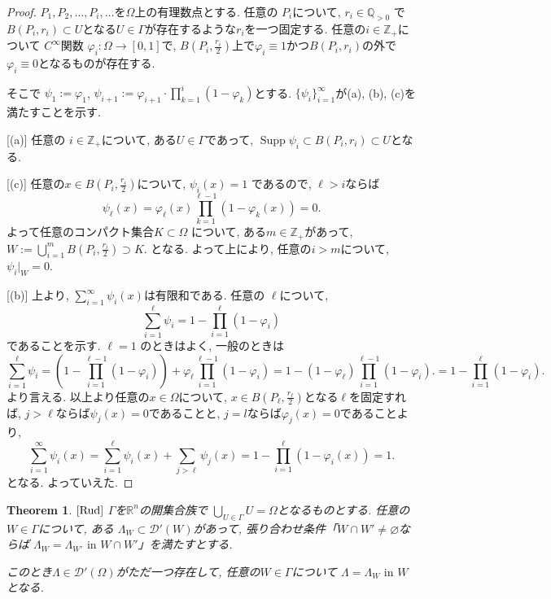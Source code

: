 \documentclass[dvipdfmx,a4paper,11pt]{article} %
\newtheorem{thm}{Theorem}[section]
\theoremstyle{definition}
\theoremstyle{remark}
\numberwithin{equation}{section}
\newcommand{\N}{\mathbb{Z}_+}
\begin{document}
\begin{proof}
\(P_1, P_2, \dots, P_i, \dots\)を\(\Omega\)上の有理数点とする. 
任意の \(P_i\)について,  \(r_i \in \mathbb{Q}_{>0}\) で\(B(P_i, r_i) \subset U\)となる$U \in \Gamma$が存在するような$r_i$を一つ固定する. 
任意の\(i \in \N\)について
\(C^\infty\)関数 \(\varphi_i: \Omega \to [0,1]\)で, 
$B(P_i, \tfrac{r_i}{2})$上で\(\varphi_i \equiv 1\)かつ\(B(P_i, r_i)\)の外で\(\varphi_i \equiv 0\)となるものが存在する.

そこで \(\psi_1 := \varphi_1\), \(\psi_{i+1} := \varphi_{i+1} \cdot \prod_{k=1}^i (1-\varphi_k)\)とする.
 \(\{\psi_i\}_{i=1}^\infty\)が(a), (b), (c)を満たすことを示す.

[(a)]
任意の \(i \in \N\)について, ある$U \in \Gamma$であって, 
 \(\operatorname{Supp}\psi_i \subset B(P_i, r_i) \subset U\)となる.
 
 [(c)]
任意の\(x \in B(P_i, \tfrac{r_i}{2})\)について, $\psi_i (x)=1$
であるので, $\ell>i$ならば 
\[
\psi_\ell(x) = \varphi_\ell(x) \prod_{k=1}^{\ell -1} (1-\varphi_k(x)) = 0.
\]
よって任意のコンパクト集合\( K \subset \Omega\) について, ある\( m \in \N\)があって,   
\(W := \bigcup_{i=1}^m B(P_i, \tfrac{r_i}{2}) \supset K\). 
となる. よって上により,  任意の$ i > m$について, \(\psi_i|_W = 0\). 

[(b)]
上より, \(\sum_{i=1}^\infty \psi_i(x)\)は有限和である.
任意の \(\ell\)について,  \[\sum_{i=1}^\ell \psi_i = 1 - \prod_{i=1}^\ell (1-\varphi_i)\]であることを示す.
\(\ell=1\) のときはよく, 
一般のときは
\[
\sum_{i=1}^\ell \psi_i = (1-\prod_{i=1}^{\ell-1}(1-\varphi_i)) + \varphi_\ell \prod_{i=1}^{\ell-1}(1-\varphi_i)
= 1 - (1 - \varphi_{\ell})\prod_{i=1}^{\ell-1} (1-\varphi_i).
= 1 - \prod_{i=1}^\ell (1-\varphi_i).
\]
より言える. 
以上より任意の\(x \in \Omega\)について, \(x \in B(P_\ell, \tfrac{r_\ell}{2})\)となる\(\ell\)を固定すれば, 
$j > \ell$ならば$\psi_{j}(x)=0$であることと, $j=l$ならば$\varphi_j(x)=0$であることより, 
\[
\sum_{i=1}^\infty \psi_i(x) 
= \sum_{i=1}^\ell \psi_i(x) + \sum_{j>\ell} \psi_j(x)
= 1 - \prod_{i=1}^\ell (1-\varphi_i(x)) = 1.
\]
となる. よっていえた.
\end{proof}

\begin{tcolorbox}[mybox]
\begin{thm}{$\cite[Thm 6.21]{Rud}$}
\label{thm-H-21}
\(\Gamma\)を\(\mathbb{R}^n\)の開集合族で
\(\bigcup_{U \in \Gamma} U = \Omega\)となるものとする. 
任意の \(W \in \Gamma\)について, ある \(\Lambda_W \subset \mathcal{D}'(W)\)があって, 
張り合わせ条件「\(W \cap W' \neq \varnothing\)ならば \(\Lambda_W = \Lambda_{W'} \text{ in } W \cap W'\)」を満たすとする.

このとき\(\Lambda \in \mathcal{D}'(\Omega)\)がただ一つ存在して, 任意の$W \in \Gamma$について
 \(\Lambda = \Lambda_W \text{ in } W \)となる. 
\end{thm}
\end{tcolorbox}
\end{document}
